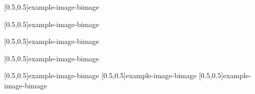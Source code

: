 



\graphicspath{{Figures/}{Figures/Iceland}}


\subtitle{Day 3}
\date{09.10.2019}


    
    
    
    [0.5,0.5]{example-image-b}{image}
    
    [0.5,0.5]{example-image-b}{image}
    
    [0.5,0.5]{example-image-b}{image}
    
    [0.5,0.5]{example-image-b}{image}
    
    
    
    [0.5,0.5]{example-image-b}{image}
    [0.5,0.5]{example-image-b}{image}
    [0.5,0.5]{example-image-b}{image}


